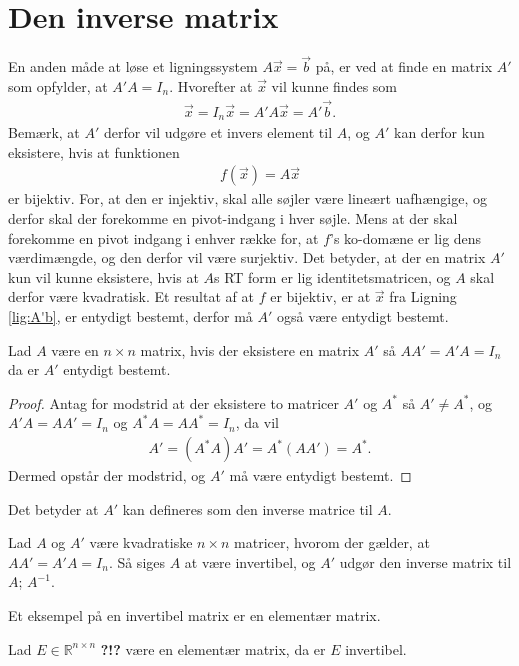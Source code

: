 \section{Den inverse matrix}
En anden måde at løse et ligningssystem $A\vec{x} = \vec{b}$ på, er ved at finde en matrix $A'$ som opfylder, at $A'A = I_n$.
Hvorefter at $\vec{x}$ vil kunne findes som
\begin{align}
\vec{x}= I_n\vec{x} = A'A\vec{x} = A'\vec{b}.
\label{lig:A'b}
\end{align}
Bemærk, at $A'$ derfor vil udgøre et invers element til $A$, og $A'$ kan derfor kun eksistere, hvis at funktionen
\begin{align*}
f(\vec{x}) = A \vec{x} 
\label{lig:funktion}
\end{align*}
er bijektiv.
For, at den er injektiv, skal alle søjler være lineært uafhængige, og derfor skal der forekomme en pivot-indgang i hver søjle.
Mens at der skal forekomme en pivot indgang i enhver række for, at $f$'s ko-domæne er lig dens værdimængde, og den derfor vil være surjektiv. 
Det betyder, at der en matrix $A'$ kun vil kunne eksistere, hvis at $A$s RT form er lig identitetsmatricen, og $A$ skal derfor være kvadratisk.
Et resultat af at $f$ er bijektiv, er at $\vec{x}$ fra Ligning \eqref{lig:A'b}, er entydigt bestemt, derfor må $A'$ også være entydigt bestemt.
\begin{stn}
Lad $A$ være en $n \times n $ matrix, hvis der eksistere en matrix $A'$ så $AA'= A'A = I_n$ da er $A'$ entydigt bestemt.
\label{stn:endtydiginvers}
\end{stn}
\begin{proof}
Antag for modstrid at der eksistere to matricer $A'$ og $A^*$ så $A' \neq A^*$, og $A'A= AA' = I_n$ og $A^*A = AA^* = I_n$, da vil
\begin{align*}
A' = (A^*A)A' = A^*(AA') = A^*.
\end{align*}
Dermed opstår der modstrid, og $A'$ må være entydigt bestemt.
\end{proof}
Det betyder at $A'$ kan defineres som den inverse matrice til $A$.
\begin{defn}
Lad $A$ og $A'$ være kvadratiske $n \times n$ matricer, hvorom der gælder, at $AA'=A'A=I_n$. 
Så siges $A$ at være invertibel, og $A'$ udgør den inverse matrix til $A$; $A^{-1}$. 
\label{def(inversmatrix)}
\end{defn}
Et eksempel på en invertibel matrix er en elementær matrix.
\begin{lma}
Lad $E \in \mathds{R}^{n\times n}$ \textbf{?!?} være en elementær matrix, da er $E$ invertibel.
\label{lma:Einvertibel}
\end{lma}
